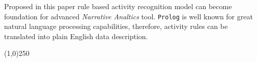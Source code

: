 \documentclass[12pt, a4paper, pdflatex, leqno, twoside, openright]{report}
\begin{document}
Proposed in this paper rule based activity recognition model can become foundation for advanced \emph{Narrative Analtics} tool. \texttt{Prolog} is well known for great natural language processing capabilities, therefore, activity rules can be translated into plain English data description.

\begin{center}
\noindent \line(1,0){250}
\end{center}

{}

% 
\end{document}
